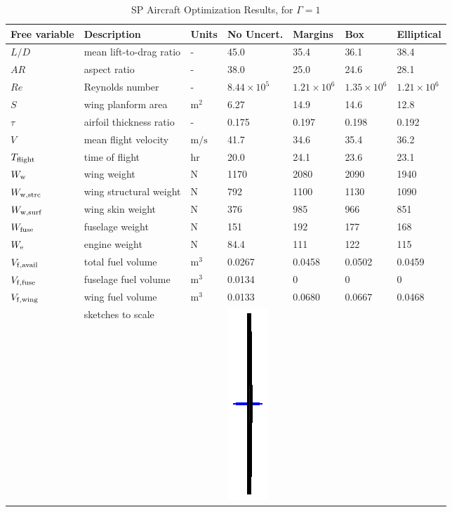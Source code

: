 \begin{table}[!h]
\begin{center}
\caption{\label{tab:results} SP Aircraft Optimization Results, for $\Gamma = 1$}
\begin{tabular}{C{2cm} C{3.8cm} C{1.25cm} C{1.6cm} C{1.6cm} C{1.6cm} C{1.6cm}}
\hline
Free variable & Description & Units & No Uncert. & Margins & Box & Elliptical \\
\hline
$L/D$ & mean lift-to-drag ratio & - & 45.0 & 35.4 & 36.1 & 38.4 \\
$AR$ & aspect ratio & - & 38.0 & 25.0 & 24.6 & 28.1 \\
$Re$ & Reynolds number & - & $8.44 \times 10^5$ & $1.21 \times 10^6$ & $1.35\times 10^6$ & $1.21 \times 10^6$ \\
$S$ & wing planform area &$\mathrm{m^2}$ & 6.27 & 14.9 & 14.6 & 12.8 \\
$\tau$ & airfoil thickness ratio & - & 0.175 & 0.197 & 0.198 & 0.192 \\
$V$ & mean flight velocity &$\mathrm{m/s}$ & 41.7 & 34.6 & 35.4 & 36.2 \\
$T_{\rm{flight}}$ & time of flight & $\mathrm{hr}$ & 20.0 & 24.1 & 23.6 & 23.1 \\
$W_{\rm{w}}$ & wing weight & $\mathrm{N}$ & 1170 & 2080 & 2090 & 1940 \\
$W_{\rm{w,strc}}$ & wing structural weight &$\mathrm{N}$ & 792 & 1100 & 1130 & 1090 \\
$W_{\rm{w,surf}}$ & wing skin weight &$\mathrm{N}$ & 376 & 985 & 966 & 851 \\
$W_{\rm{fuse}}$ & fuselage weight &$\mathrm{N}$ & 151 & 192 & 177 & 168 \\
$W_{\rm{e}}$ & engine weight &$\mathrm{N}$ & 84.4 & 111 & 122 & 115 \\
$V_{\rm{f,avail}}$ & total fuel volume & $\mathrm{m^3}$ & 0.0267 & 0.0458 & 0.0502 & 0.0459 \\
$V_{\rm{f,fuse}}$ & fuselage fuel volume & $\mathrm{m^3}$ & 0.0134 & 0 & 0 & 0 \\
$V_{\rm{f,wing}}$ & wing fuel volume &$\mathrm{m^3}$ & 0.0133 & 0.0680 & 0.0667 & 0.0468    \\
& sketches to scale & &
    \includegraphics[trim={10.5cm 1.5cm 10.5cm 1.5cm},clip,scale=0.7]{nominal.eps} &

\end{tabular}
\end{center}
\end{table}
